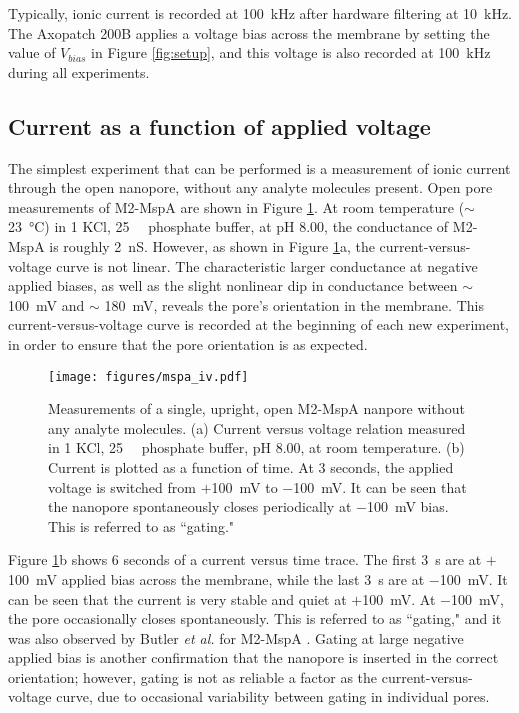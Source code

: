Typically, ionic current is recorded at \SI{100}{\kHz} after hardware filtering at \SI{10}{\kHz}.  The Axopatch 200B applies a voltage bias across the membrane by setting the value of $V_{bias}$ in Figure \ref{fig:setup}, and this voltage is also recorded at \SI{100}{\kHz} during all experiments.

\subsection{Current as a function of applied voltage}

The simplest experiment that can be performed is a measurement of ionic current through the open nanopore, without any analyte molecules present.  Open pore measurements of M2-MspA are shown in Figure \ref{fig:iv_mspa}.  At room temperature ($\sim$ \SI{23}{\degreeCelsius}) in \SI{1}{\Molar} KCl, \SI{25}{\milli\Molar} phosphate buffer, at pH \num{8.00}, the conductance of M2-MspA is roughly \SI{2}{\nano\siemens}.  However, as shown in Figure \ref{fig:iv_mspa}a, the current-versus-voltage curve is not linear.  The characteristic larger conductance at negative applied biases, as well as the slight nonlinear dip in conductance between $\sim$ \SI{100}{\mV} and $\sim$ \SI{180}{\mV}, reveals the pore's orientation in the membrane.  This current-versus-voltage curve is recorded at the beginning of each new experiment, in order to ensure that the pore orientation is as expected.

\begin{figure}[h]
\begin{centering}
\texttt{[image: figures/mspa\_iv.pdf]}
\caption[MspA current versus voltage]{Measurements of a single, upright, open M2-MspA nanpore without any analyte molecules.  (a) Current versus voltage relation measured in \SI{1}{\Molar} KCl, \SI{25}{\milli\Molar} phosphate buffer, pH \num{8.00}, at room temperature.  (b) Current is plotted as a function of time.  At \num{3} seconds, the applied voltage is switched from $+$\SI{100}{\milli\volt} to \SI{-100}{\milli\volt}.  It can be seen that the nanopore spontaneously closes periodically at \SI{-100}{\milli\volt} bias.  This is referred to as ``gating."}
\label{fig:iv_mspa}
\end{centering}
\end{figure}

Figure \ref{fig:iv_mspa}b shows \num{6} seconds of a current versus time trace.  The first \SI{3}{\s} are at $+$\SI{100}{\mV} applied bias across the membrane, while the last \SI{3}{\s} are at $-$\SI{100}{\mV}.  It can be seen that the current is very stable and quiet at $+$\SI{100}{\mV}.  At $-$\SI{100}{\mV}, the pore occasionally closes spontaneously.  This is referred to as ``gating," and it was also observed by Butler \textit{et al.} for M2-MspA \citep{Butler2008}.  Gating at large negative applied bias is another confirmation that the nanopore is inserted in the correct orientation; however, gating is not as reliable a factor as the current-versus-voltage curve, due to occasional variability between gating in individual pores.


